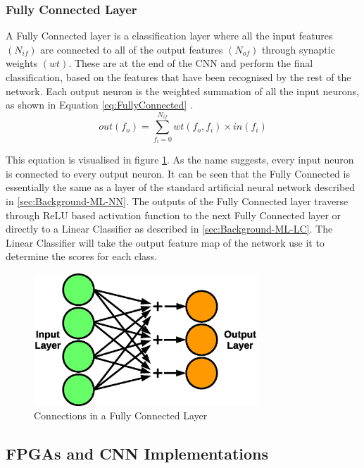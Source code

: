 \documentclass[12pt]{article}
\begin{document}
\subsubsection{Fully Connected Layer}
\label{sec:Background-CNN-FC}


A Fully Connected layer is a classification layer where all the input features $(N_{if})$ are connected to all of the output features $(N_{of})$ through synaptic weights $(wt)$. These are at the end of the CNN and perform the final classification, based on the features that have been recognised by the rest of the network. Each output neuron is the weighted summation of all the input neurons, as shown in Equation \ref{eq:FullyConnected} \cite{SudaFpgaAccelerator}.
\begin{equation}
out(f_o)=\sum^{N_{if}}_{f_i=0}wt(f_o,f_i)\times in(f_i)
\label{eq:FullyConnected}
\end{equation}

This equation is visualised in figure \ref{fig:fc}. As the name suggests, every input neuron is connected to every output neuron. It can be seen that the Fully Connected is essentially the same as a layer of the standard artificial neural network described in \ref{sec:Background-ML-NN}. The outputs of the Fully Connected layer traverse through ReLU based activation function to the next Fully Connected layer or directly to a Linear Classifier as described in \ref{sec:Background-ML-LC}. The Linear Classifier will take the output feature map of the network use it to determine the scores for each class.

\begin{figure}[h]
\centering
\includegraphics[width=0.75\textwidth]{figures/fc.eps}
\caption{Connections in a Fully Connected Layer}
\label{fig:fc}
\end{figure}

\subsection{FPGAs and CNN Implementations}
\label{sec:Background-FpgaCnnImpl}
\end{document}
